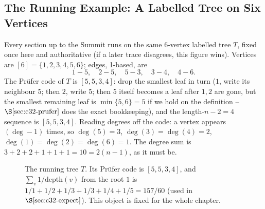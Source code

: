 \subsection*{The Running Example: A Labelled Tree on Six Vertices}

Every section up to the Summit runs on the same 6-vertex labelled tree \(T\),
fixed once here and authoritative (if a later trace disagrees, this figure
wins).  Vertices are \([6]=\{1,2,3,4,5,6\}\); edges, 1-based, are
\[
  1\!-\!5,\quad 2\!-\!5,\quad 5\!-\!3,\quad 3\!-\!4,\quad 4\!-\!6 .
\]
The Pr\"ufer code of \(T\) is \([5,5,3,4]\): drop the smallest leaf in turn
(\(1\), write its neighbour \(5\); then \(2\), write \(5\); then \(5\) itself
becomes a leaf after \(1,2\) are gone, but the smallest remaining leaf is
\(\min\{5,6\}=5\) if we hold on the definition -- \(\secref{c32-prufer}\) does
the exact bookkeeping), and the length-\(n-2=4\) sequence is \([5,5,3,4]\).
Reading degrees off the code: a vertex appears \((\deg-1)\) times, so
\(\deg(5)=3\), \(\deg(3)=\deg(4)=2\), \(\deg(1)=\deg(2)=\deg(6)=1\).  The
degree sum is \(3+2+2+1+1+1=10=2(n-1)\), as it must be.

\begin{figure}[H]
\centering
{}
\caption{The running tree \(T\).  Its Pr\"ufer code is \([5,5,3,4]\), and
\(\sum_v 1/\mathrm{depth}(v)\) from the root \(1\) is \(1/1+1/2+1/3+1/3+1/4+1/5
= 157/60\) (used in \(\secref{c32-expect}\)).  This object is fixed for the
whole chapter.}
\label{fig:c32-tree}
\end{figure}

